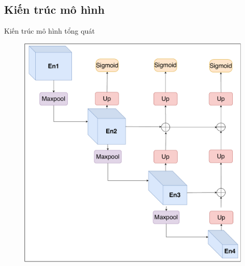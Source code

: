 \documentclass[
	10pt,                %
	aspectratio=169,     %
]{beamer}
\begin{document}
\subsection{Kiến trúc mô hình}
	\begin{frame}{Kiến trúc mô hình tổng quát}
		\vspace{-0.3cm}
		\begin{figure}[h!]
			\includegraphics[scale=0.3]{figures/arch/u2net3d-abstract.pdf}
		\end{figure}
	\end{frame}
	
\end{document}
